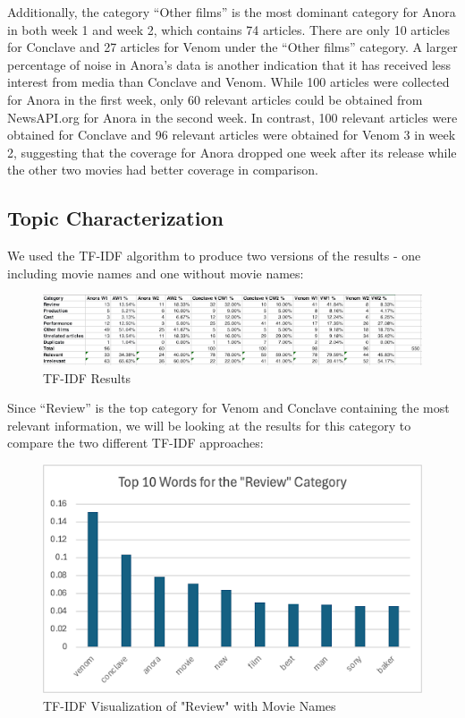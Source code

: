 \documentclass[letterpaper]{article} %
\begin{document}
Additionally, the category “Other films” is the most dominant category for Anora in both week 1 and week 2, which contains 74 articles. There are only 10 articles for Conclave and 27 articles for Venom under the “Other films” category. A larger percentage of noise in Anora’s data is another indication that it has received less interest from media than Conclave and Venom.
While 100 articles were collected for Anora in the first week, only 60 relevant articles could be obtained from NewsAPI.org for Anora in the second week. In contrast, 100 relevant articles were obtained for Conclave and 96 relevant articles were obtained for Venom 3 in week 2, suggesting that the coverage for Anora dropped one week after its release while the other two movies had better coverage in comparison.

\subsection{Topic Characterization}
We used the TF-IDF algorithm to produce two versions of the results - one including movie names and one without movie names:
\begin{figure}[H]
\centering
\includegraphics[width=0.9\columnwidth]{LaTeX/figure5.png}
\caption{TF-IDF Results}
\label{fig:tf-idf}
\end{figure}
Since “Review” is the top category for Venom and Conclave containing the most relevant information, we will be looking at the results for this category to compare the two different TF-IDF approaches:
\begin{figure}[H]
\centering
\includegraphics[width=0.9\columnwidth]{LaTeX/figure6.png}
\caption{TF-IDF Visualization of "Review" with Movie Names}
\label{fig:}
\end{figure}
\end{document}
